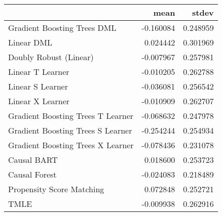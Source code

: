 \begin{tabular}{lrr}
\toprule
{} &      mean &     stdev \\
\midrule
Gradient Boosting Trees DML       & -0.160084 &  0.248959 \\
Linear DML                        &  0.024442 &  0.301969 \\
Doubly Robust (Linear)            & -0.007967 &  0.257981 \\
Linear T Learner                  & -0.010205 &  0.262788 \\
Linear S Learner                  & -0.036081 &  0.256542 \\
Linear X Learner                  & -0.010909 &  0.262707 \\
Gradient Boosting Trees T Learner & -0.068632 &  0.247978 \\
Gradient Boosting Trees S Learner & -0.254244 &  0.254934 \\
Gradient Boosting Trees X Learner & -0.078436 &  0.231078 \\
Causal BART                       &  0.018600 &  0.253723 \\
Causal Forest                     & -0.024083 &  0.218489 \\
Propensity Score Matching         &  0.072848 &  0.252721 \\
TMLE                              & -0.009938 &  0.262916 \\
\bottomrule
\end{tabular}
